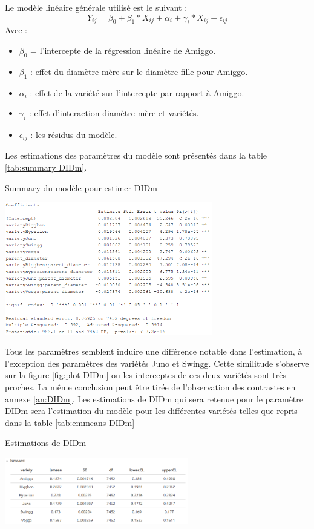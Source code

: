 Le modèle linéaire générale utilisé est le suivant : 
\begin{equation}
Y_{ij}=\beta_{0}+\beta_{1}*X_{ij}+\alpha_{i}+\gamma_{i}*X_{ij}+\epsilon_{ij}
\end{equation}
Avec : 
\begin{itemize}
    \item $\beta_{0}$ = l'intercepte de la régression linéaire de Amiggo.
    \item $\beta_{1}$ : effet du diamètre mère sur le diamètre fille pour Amiggo.
    \item $\alpha_{i}$ : effet de la variété sur l'intercepte par rapport à Amiggo.
    \item $\gamma_{i}$ : effet d'interaction diamètre mère et variétés.
    \item $\epsilon_{ij}$ : les résidus du modèle.
\end{itemize}

Les estimations des paramètres du modèle sont présentés dans la table \ref{tab:summary DIDm}.
\newpage

\begin{table}[ht]
    \centering
    \caption{Summary du modèle pour estimer DIDm}
    \includegraphics[width=0.68\textwidth]{Image/summary DIDm.png}
    \label{tab:summary DIDm}
\end{table}

Tous les paramètres semblent induire une différence notable dans l'estimation, à l'exception des paramètres des variétés Juno et Swingg.
Cette similitude s'observe sur la figure \ref{fig:plot DIDm} ou les interceptes de ces deux variétés sont très proches.
La même conclusion peut être tirée de l'observation des contrastes en annexe \ref{an:DIDm}.
Les estimations de DIDm qui sera retenue pour le paramètre DIDm sera l'estimation du modèle pour les différentes variétés telles que repris dans la table \ref{tab:emmeans DIDm}

\begin{table}[ht]
    \centering
    \caption{Estimations de DIDm}
    \includegraphics[width=0.6\textwidth]{Image/lsmeans DIDm.png}
    \label{tab:emmeans DIDm}
\end{table}

